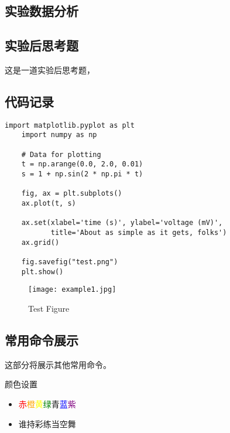 \documentclass[dvipsnames, svgnames,a4paper,11pt]{article}
\begin{document}
\subsection{实验数据分析}
\subsection{实验后思考题}
\begin{question}
	这是一道实验后思考题，\lipsum[20]
\end{question}

\clearpage
{}


\clearpage
\appendix
\appendixpage
\addappheadtotoc
\subsection{代码记录}
\begin{lstlisting}[style=pythonstyle,caption=代码记录示例]
	import matplotlib.pyplot as plt
	import numpy as np
	
	# Data for plotting
	t = np.arange(0.0, 2.0, 0.01)
	s = 1 + np.sin(2 * np.pi * t)
	
	fig, ax = plt.subplots()
	ax.plot(t, s)
	
	ax.set(xlabel='time (s)', ylabel='voltage (mV)',
		   title='About as simple as it gets, folks')
	ax.grid()
	
	fig.savefig("test.png")
	plt.show()
\end{lstlisting}
\begin{figure}[H]
    \centering
    \texttt{[image: example1.jpg]}
    \caption{Test Figure}
\end{figure}

\clearpage
\subsection{常用命令展示}
这部分将展示其他常用命令。

\begin{tbox}{颜色设置}
\begin{itemize}
	\item  \textcolor{Red}{赤}\textcolor{Orange}{橙}\textcolor{Yellow}{黄}\textcolor{Green}{绿}\textcolor{Emerald}{青}\textcolor{Blue}{蓝}\textcolor{Purple}{紫}
	\item  谁持彩练当空舞
\end{itemize}
\end{tbox}
\end{document}
